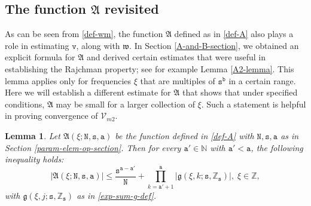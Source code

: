 \documentclass[12pt, twoside]{article}
\newtheorem{lemma}[theorem]{Lemma}
\theoremstyle{definition}
\numberwithin{equation}{section}
\begin{document}
\subsection{The function $\mathfrak A$ revisited}
As can be seen from \eqref{def-wm}, the function $\mathfrak A$ defined as in \eqref{def-A} also plays a role in estimating $\mathtt v$, along with $\mathfrak w$. In Section \ref{A-and-B-section}, we  obtained an explicit formula for $\mathfrak A$ and derived certain estimates that were useful in establishing the Rajchman property; see for example Lemma \ref{A2-lemma}. This lemma applies only for frequencies $\xi$ that are multiples of $\mathtt s^{\mathtt b}$ in a certain range. Here we will establish a different estimate for $\mathfrak A$ that shows that under specified conditions, $\mathfrak A$ may be small for a larger collection of $\xi$. Such a statement is helpful in proving convergence of $\mathcal V_{m2}$. 
\begin{lemma} 
Let $\mathfrak A(\xi; \mathtt N, \mathtt s, \mathtt a)$ be the function defined in \eqref{def-A} with $\mathtt N, \mathtt s, \mathtt a$ as in Section \ref{param-elem-op-section}. Then for every $\mathtt a' \in \mathbb N$ with $\mathtt a' < \mathtt a$, the following inequality holds: 
\begin{equation} \label{A-alt-est} 
\bigl| \mathfrak A(\xi; \mathtt N, \mathtt s, \mathtt a) \bigr| \leq \frac{\mathtt s^{\mathtt a- \mathtt a'}}{\mathtt N} + \prod_{k = \mathtt a'+1}^{\mathtt a} |\mathfrak g(\xi, k; \mathtt s, \mathbb Z_{\mathtt s})|,\; \xi \in \mathbb{Z}, 
\end{equation} 
with $\mathfrak g(\xi, j; \mathtt s, \mathbb Z_{\mathtt s})$ as in \eqref{exp-sum-g-def}. 
\end{lemma} 
\end{document}
